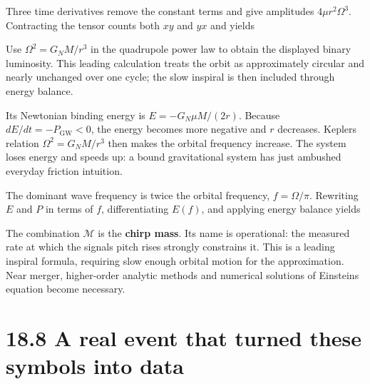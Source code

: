 \documentclass[
  11pt,
  letterpaper,
  oneside,
  openany]{scrbook}
\begin{document}
Three time derivatives remove the constant terms and give amplitudes
\(4\mu r^2\Omega^3\). Contracting the tensor counts both \(xy\) and
\(yx\) and yields

\begin{center}
\begingroup
{}
\ifdim\wd\grmathbox>\linewidth
\resizebox{\linewidth}{!}{\usebox{\grmathbox}}
\else\usebox{\grmathbox}\fi
\endgroup
\end{center}

Use \(\Omega^2=G_NM/r^3\) in the quadrupole power law to obtain the
displayed binary luminosity. This leading calculation treats the orbit
as approximately circular and nearly unchanged over one cycle; the slow
inspiral is then included through energy balance.

Its Newtonian binding energy is \(E=-G_N\mu M/(2r)\). Because
\(dE/dt=-P_{\mathrm{GW}}<0\), the energy becomes more negative and \(r\)
decreases. Kepler\textquotesingle s relation \(\Omega^2=G_NM/r^3\) then
makes the orbital frequency increase. The system loses energy and speeds
up: a bound gravitational system has just ambushed everyday friction
intuition.

The dominant wave frequency is twice the orbital frequency,
\(f=\Omega/\pi\). Rewriting \(E\) and \(P\) in terms of \(f\),
differentiating \(E(f)\), and applying energy balance yields

\begin{center}
\begingroup
{}
\ifdim\wd\grmathbox>\linewidth
\resizebox{\linewidth}{!}{\usebox{\grmathbox}}
\else\usebox{\grmathbox}\fi
\endgroup
\end{center}

The combination \(\mathcal M\) is the \textbf{chirp mass}. Its name is
operational: the measured rate at which the signal\textquotesingle s
pitch rises strongly constrains it. This is a leading inspiral formula,
requiring slow enough orbital motion for the approximation. Near merger,
higher-order analytic methods and numerical solutions of
Einstein\textquotesingle s equation become necessary.

\hypertarget{a-real-event-that-turned-these-symbols-into-data}{%
\section{18.8 A real event that turned these symbols into
data}\label{a-real-event-that-turned-these-symbols-into-data}}
\end{document}
